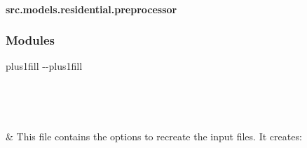 \documentclass[letterpaper,10pt,english]{sphinxmanual}
\begin{document}
\sphinxstepscope


\paragraph{src.models.residential.preprocessor}
\label{\detokenize{src.models.residential.preprocessor:module-src.models.residential.preprocessor}}\label{\detokenize{src.models.residential.preprocessor:src-models-residential-preprocessor}}\label{\detokenize{src.models.residential.preprocessor::doc}}\subsubsection*{Modules}


\begin{savenotes}
\sphinxatlongtablestart
\sphinxthistablewithglobalstyle
\sphinxthistablewithnovlinesstyle
\makeatletter
  \LTleft \@totalleftmargin plus1fill
  \LTright\dimexpr\columnwidth-\@totalleftmargin-\linewidth\relax plus1fill
\makeatother
\begin{longtable}{}
\sphinxtoprule
\endfirsthead

\\
\sphinxtoprule
\endhead

\sphinxbottomrule
{}\\
\endfoot

\endlastfoot
\sphinxtableatstartofbodyhook

\sphinxAtStartPar
{\hyperref[\detokenize{src.models.residential.preprocessor.generate_inputs:module-src.models.residential.preprocessor.generate_inputs}]{}}
&
\sphinxAtStartPar
This file contains the options to re\sphinxhyphen{}create the input files. It creates:
\\
\sphinxbottomrule
\end{longtable}
\sphinxtableafterendhook
\sphinxatlongtableend
\end{savenotes}

\sphinxstepscope
\end{document}
